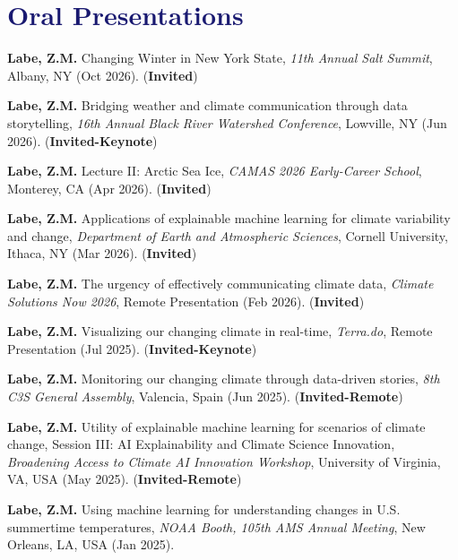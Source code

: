 \documentclass[margin,line,palatino,courier,10pt]{res}
\begin{document}
\begin{resume}
\vspace{-0.1in}
\noindent\textcolor{MidnightBlue}{\makebox[\linewidth][r]{\rule{\textwidth}{5pt}}}
\vspace{-0.3in} 

\section{\sc \textcolor{MidnightBlue}{\large{\textbf{Oral Presentations}}}}
\begin{etaremune}[leftmargin=0in,topsep=0in,parsep=0in]
\item \textbf{Labe, Z.M.} Changing Winter in New York State, \textit{11th Annual Salt Summit}, Albany, NY (Oct 2026). (\textbf{Invited})
\item \textbf{Labe, Z.M.} Bridging weather and climate communication through data storytelling, \textit{16th Annual Black River Watershed Conference}, Lowville, NY (Jun 2026). (\textbf{Invited-Keynote})
\item \textbf{Labe, Z.M.} Lecture II: Arctic Sea Ice, \textit{CAMAS 2026 Early-Career School}, Monterey, CA (Apr 2026). (\textbf{Invited})
\item \textbf{Labe, Z.M.} Applications of explainable machine learning for climate variability and change, \textit{Department of Earth and Atmospheric Sciences}, Cornell University, Ithaca, NY (Mar 2026). (\textbf{Invited})
\item \textbf{Labe, Z.M.} The urgency of effectively communicating climate data, \textit{Climate Solutions Now 2026}, Remote Presentation (Feb 2026). (\textbf{Invited})
\item \textbf{Labe, Z.M.} Visualizing our changing climate in real-time, \textit{Terra.do}, Remote Presentation (Jul 2025). (\textbf{Invited-Keynote})
\item \textbf{Labe, Z.M.} Monitoring our changing climate through data-driven stories, \textit{8th C3S General Assembly}, Valencia, Spain (Jun 2025). (\textbf{Invited-Remote})
\item \textbf{Labe, Z.M.} Utility of explainable machine learning for scenarios of climate change, Session III: AI Explainability and Climate Science Innovation, \textit{Broadening Access to Climate AI Innovation Workshop}, University of Virginia, VA, USA (May 2025). (\textbf{Invited-Remote})
\item \textbf{Labe, Z.M.} Using machine learning for understanding changes in U.S. summertime temperatures, \textit{NOAA Booth, 105th AMS Annual Meeting}, New Orleans, LA, USA (Jan 2025).

\end{etaremune}
\end{resume}
\end{document}
